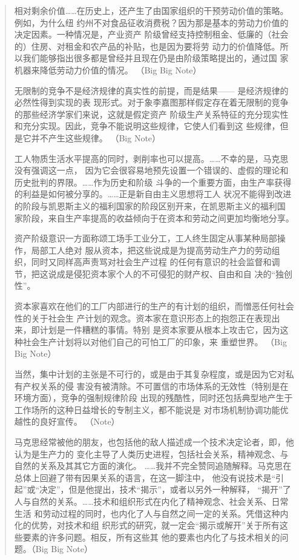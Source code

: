 \begin{quotation}
相对剩余价值……在历史上，还产生了由国家组织的干预劳动价值的策略。例如，为什么纽
约州不对食品征收消费税？因为那是基本的劳动力价值的决定因素。一种情况是，产业资产
阶级曾经支持控制租金、低廉的（社会的）住房、对租金和农产品的补贴，也是因为要将劳
动力的价值降低。所以我们能够指出很多都是曾经并且现在仍是由阶级策略提出的，通过国
家机器来降低劳动力价值的情况。 （Big Big Note）

无限制的竞争不是经济规律的真实性的前提，而是结果—— 是经济规律的必然性得到实现的表
现形式。对于象李嘉图那样假定存在着无限制的竞争的那些经济学家们来说，这就是假定资产
阶级生产关系特征的充分现实性和充分实现。因此，竞争不能说明这些规律，它使人们看到这
些规律，但是它并不产生这些规律。 （Big Note）

工人物质生活水平提高的同时，剥削率也可以提高。……不幸的是，马克思没有强调这一点，
因为它会很容易地预先设置一个错误的、虚假的理论和历史批判的界限。……作为历史和阶级
斗争的一个重要方面，由生产率获得的利益是如何被分享的。……正是新自由主义思想将工人
状况不能得到改进的阶段与凯恩斯主义的福利国家的阶段区别开来，在凯恩斯主义的福利国
家阶段，来自生产率提高的收益倾向于在资本和劳动之间更加均衡地分享。 

资产阶级意识一方面称颂工场手工业分工，工人终生固定从事某种局部操作，局部工人绝对
服从资本，把这些说成是为提高劳动生产力的劳动组织，同时又同样高声责骂对社会生产过程
的任何有意识的社会监督和调节，把这说成是侵犯资本家个人的不可侵犯的财产权、自由和自
决的“独创性”。 

资本家喜欢在他们的工厂内部进行的生产的有计划的组织，而憎恶任何社会性的关于社会生
产计划的观念。资本家在意识形态上的抱怨正在表现出来，即计划是一件糟糕的事情。特别
是资本家要从根本上攻击它，因为这种社会生产计划将以对他们自己的可怕工厂的印象，来
重塑世界。 （Big Big Note）

当然，集中计划的主张是不可行的，或是由于其复杂程度，或是因为它对私有产权关系的侵
害没有被清除。不可置信的市场体系的无效性（特别是在环境方面），竞争的强制规律阶段
出现的残酷性，同时还包括典型地产生于工作场所的这种日益增长的专制主义，都不能说是
对市场机制协调功能优越性的良好宣传。 （Note）

马克思经常被他的朋友，也包括他的敌人描述成一个技术决定论者，即，他认为是生产力的
变化主导了人类历史进程，包括社会关系，精神观念、与自然的关系及其其它方面的演化。
……我并不完全赞同追随解释。马克思在总体上回避了带有因果关系的语言，在这一脚注中，
他没有说技术是“引起”或“决定”，但是他提出，技术“揭示”，或者以另外一种解释，
“揭开”了人与自然的关系。……技术和组织形式在内化了精神观念、社会关系、日常生活
和劳动过程的同时，也内化了人与自然之间一定的关系。凭借这种内化的优势，对技术和组
织形式的研究，就一定会“揭示或解开”关于所有这些要素的许多问题。相反，所有这些其
他的要素也内化了与技术相关的问题。（Big Big Note）


\end{quotation}
